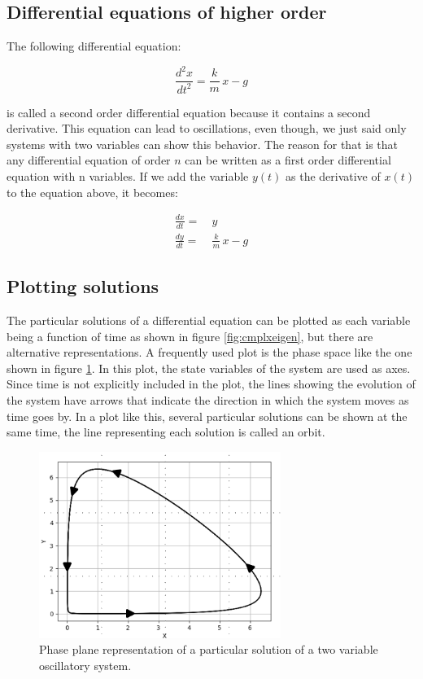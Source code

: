 \documentclass[12pt]{article}
\begin{document}
\FloatBarrier

\subsection{Differential equations of higher order}

The following differential equation:

\begin{equation}
	 \frac{d^2x}{dt^2} = \frac{k}{m} \, x - g \nonumber
\end{equation}

is called a second order differential equation because it contains a second derivative. This equation can lead to oscillations, even though, we just said only systems with two variables can show this behavior. The reason for that is that any  differential equation of order $n$ can be written as a first order differential equation with n variables. If we add the variable $y(t)$ as the derivative of $x(t)$ to the equation above, it becomes:

\begin{align}
	\frac{dx}{dt} =& \: y \nonumber \\
	\frac{dy}{dt} =& \: \frac{k}{m} \, x - g \nonumber
\end{align}


\subsection{Plotting solutions}

The particular solutions of a differential equation can be plotted as each variable being a function of time as shown in figure \ref{fig:cmplxeigen}, but there are alternative representations. A frequently used plot is the phase space like the one shown in figure \ref{fig:phase_plane}. In this plot, the state variables of the system are used as axes. Since time is not explicitly included in the plot, the lines showing the evolution of the system have arrows that indicate the direction in which the system moves as time goes by. In a plot like this, several particular solutions can be shown at the same time, the line representing each solution is called an orbit. 
\begin{figure}
	\begin{center}
		\includegraphics[width=0.7\textwidth]{phase_plane}
	\end{center}
	\caption{Phase plane representation of a particular solution of a two variable oscillatory system.}
	\label{fig:phase_plane}
\end{figure}
\end{document}
